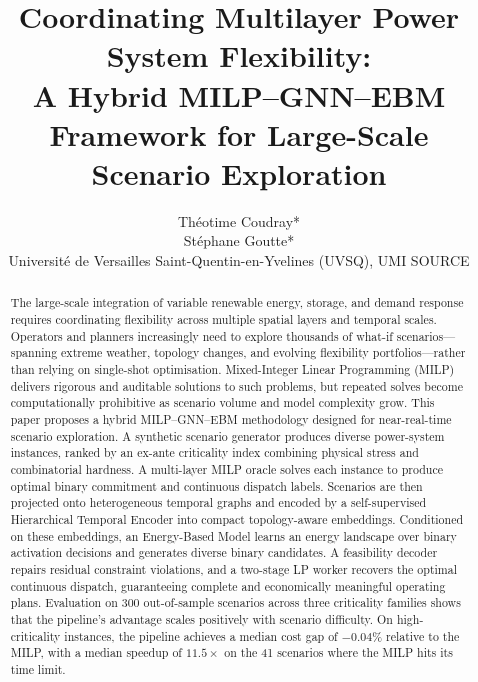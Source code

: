 \documentclass[12pt]{article}
\title{Coordinating Multilayer Power System Flexibility:\\
A Hybrid MILP--GNN--EBM Framework for Large-Scale Scenario Exploration}
\author{Th\'eotime Coudray* \\ St\'ephane Goutte*\\[2pt]
\normalsize *Universit\'e de Versailles Saint-Quentin-en-Yvelines (UVSQ), UMI SOURCE}
\date{}
\begin{document}
\maketitle

\begin{abstract}
The large-scale integration of variable renewable energy, storage, and demand response
requires coordinating flexibility across multiple spatial layers and temporal scales.
Operators and planners increasingly need to explore thousands of what-if scenarios---spanning
extreme weather, topology changes, and evolving flexibility portfolios---rather than relying on
single-shot optimisation. Mixed-Integer Linear Programming (MILP) delivers rigorous and auditable
solutions to such problems, but repeated solves become computationally prohibitive as scenario
volume and model complexity grow. This paper proposes a hybrid MILP--GNN--EBM methodology designed
for near-real-time scenario exploration. A synthetic scenario generator produces diverse
power-system instances, ranked by an
ex-ante criticality index combining physical stress and combinatorial hardness. A multi-layer MILP
oracle solves each instance to produce optimal binary commitment and continuous dispatch labels.
Scenarios are then projected onto heterogeneous temporal graphs and encoded by a self-supervised
Hierarchical Temporal Encoder into compact topology-aware embeddings. Conditioned on these
embeddings, an Energy-Based Model learns an energy landscape over binary activation decisions
and generates diverse binary candidates. A feasibility decoder repairs residual constraint violations, and a two-stage LP worker recovers
the optimal continuous dispatch, guaranteeing complete and economically meaningful operating plans.
Evaluation on 300 out-of-sample scenarios across three criticality families shows that the
pipeline's advantage scales positively with scenario difficulty. On high-criticality instances, the pipeline achieves a median cost gap of
$-0.04\%$ relative to the MILP, with a median speedup of $11.5\times$ on the 41 scenarios
where the MILP hits its time limit.
\end{abstract}
\end{document}
